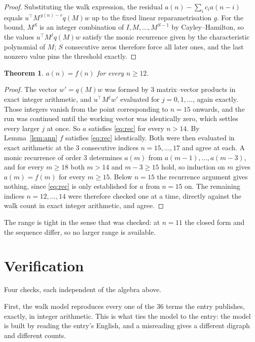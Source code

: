\documentclass[11pt,a4paper]{article}
\theoremstyle{plain}
\newtheorem{theorem}{Theorem}
\theoremstyle{definition}
\begin{document}
\begin{proof}
Substituting the walk expression, the residual $a(n)-\sum_ic_ia(n-i)$ equals
$u^{\!\top}M^{\,g(n)-r}q(M)w$ up to the fixed linear reparametrisation $g$. For the bound,
$M^{S}$ is an integer combination of $I,M,\dots,M^{S-1}$ by Cayley--Hamilton, so the values
$u^{\!\top}M^{j}q(M)w$ satisfy the monic recurrence given by the characteristic polynomial of
$M$; $S$ consecutive zeros therefore force all later ones, and the last nonzero value pins the
threshold exactly.
\end{proof}

\begin{theorem}
$a(n)=f(n)$ for every $n\ge12$.
\end{theorem}

\begin{proof}
The vector $w'=q(M)w$ was formed by $3$ matrix--vector products in exact integer
arithmetic, and $u^{\!\top}M^{j}w'$ evaluated for $j=0,1,\dots$, again exactly. Those integers
vanish from the point corresponding to $n=15$ onwards, and the run was continued until the
working vector was identically zero, which settles every larger $j$ at once. So $a$ satisfies
\eqref{eq:rec} for every $n>14$. By Lemma~\ref{lem:ann} $f$ satisfies \eqref{eq:rec}
identically. Both were then evaluated in exact arithmetic at the $3$ consecutive indices
$n=15,\dots,17$ and agree at each. A monic recurrence of order $3$
determines $a(m)$ from $a(m-1),\dots,a(m-3)$, and for every $m\ge18$ both
$m>14$ and $m-3\ge15$ hold, so induction on $m$ gives $a(m)=f(m)$ for every
$m\ge15$.
Below $n=15$ the recurrence argument gives nothing, since \eqref{eq:rec} is only
established for $a$ from $n=15$ on. The remaining indices $n=12,\dots,14$ were
therefore checked one at a time, directly against the walk count in exact integer arithmetic,
and agree.
\end{proof}

The range is tight in the sense that was checked: at $n=11$ the closed form and the sequence differ, so no larger range is available.

\section{Verification}

Four checks, each independent of the algebra above.

First, the walk model reproduces every one of the $36$ terms the entry publishes,
exactly, in integer arithmetic. This is what ties the model to the entry: the model is built
by reading the entry's English, and a misreading gives a different digraph and different
counts.
\end{document}
